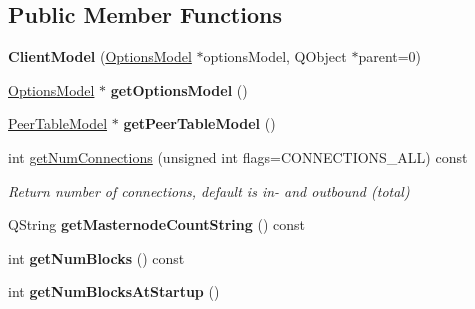 \subsection*{Public Member Functions}
\begin{DoxyCompactItemize}
\item 
\mbox{\label{class_client_model_aec1d32d5dc8c094eba66036a19a22854}} 
{\bfseries Client\+Model} (\mbox{\hyperlink{class_options_model}{Options\+Model}} $\ast$options\+Model, Q\+Object $\ast$parent=0)
\item 
\mbox{\label{class_client_model_ae8da1e2eabfbbcc49a7eed821908bdb6}} 
\mbox{\hyperlink{class_options_model}{Options\+Model}} $\ast$ {\bfseries get\+Options\+Model} ()
\item 
\mbox{\label{class_client_model_a643fc112ce94f50ac7187ecdf3c75360}} 
\mbox{\hyperlink{class_peer_table_model}{Peer\+Table\+Model}} $\ast$ {\bfseries get\+Peer\+Table\+Model} ()
\item 
\mbox{\label{class_client_model_ab1a71928e2ff3902e854d301f4cfe6ef}} 
int \mbox{\hyperlink{class_client_model_ab1a71928e2ff3902e854d301f4cfe6ef}{get\+Num\+Connections}} (unsigned int flags=C\+O\+N\+N\+E\+C\+T\+I\+O\+N\+S\+\_\+\+A\+LL) const
\begin{DoxyCompactList}\small\item\em Return number of connections, default is in-\/ and outbound (total) \end{DoxyCompactList}\item 
\mbox{\label{class_client_model_ab8dae86e417c050723fee66420a333ed}} 
Q\+String {\bfseries get\+Masternode\+Count\+String} () const
\item 
\mbox{\label{class_client_model_a9af729ddd1220f928d8cb3ef29f06f26}} 
int {\bfseries get\+Num\+Blocks} () const
\item 
\mbox{\label{class_client_model_a6bc7b2b076e7d4f999f189b6db74d909}} 
int {\bfseries get\+Num\+Blocks\+At\+Startup} ()
\item 
\mbox{\label{class_client_model_a3ecd021e48073debd6dfeb90fdb3e7bd}} 

\end{DoxyCompactItemize}
